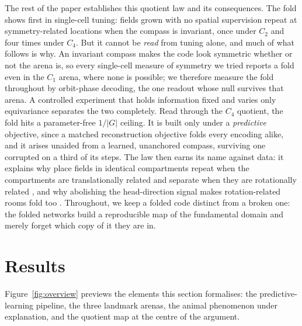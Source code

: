 \documentclass[9pt,lineno]{elife}
\begin{document}
The rest of the paper establishes this quotient law and its consequences. The fold shows first in
single-cell tuning: fields grown with no spatial supervision repeat at symmetry-related locations
when the compass is invariant, once under $C_2$ and four times under $C_4$. But it cannot be
\emph{read} from tuning alone, and much of what follows is why. An invariant compass makes the code
look symmetric whether or not the arena is, so every single-cell measure of symmetry we tried reports
a fold even in the $C_1$ arena, where none is possible; we therefore measure the fold throughout by
orbit-phase decoding, the one readout whose null survives that arena. A controlled experiment that
holds information fixed and varies only equivariance separates the two completely. Read through the
$C_4$ quotient, the fold hits a parameter-free $1/|G|$ ceiling. It is built only under a
\emph{predictive} objective, since a matched reconstruction objective folds every encoding alike, and
it arises unaided from a learned, unanchored compass, surviving one corrupted on a third of its
steps. The law then earns its name against data: it explains why place fields in identical
compartments repeat when the compartments are translationally related and separate when they are
rotationally related \citep{grieves2016, spiers2015}, and why abolishing the head-direction signal
makes rotation-related rooms fold too \citep{harland2017}. Throughout, we keep a folded code distinct
from a broken one: the folded networks build a reproducible map of the fundamental domain and merely
forget which copy of it they are in.

\section{Results}

Figure~\ref{fig:overview} previews the elements this section formalises: the predictive-learning
pipeline, the three landmark arenas, the animal phenomenon under explanation, and the quotient map at
the centre of the argument.
\end{document}
